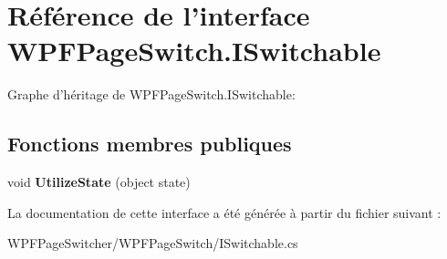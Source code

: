 \hypertarget{interface_w_p_f_page_switch_1_1_i_switchable}{\section{Référence de l'interface W\+P\+F\+Page\+Switch.\+I\+Switchable}
\label{interface_w_p_f_page_switch_1_1_i_switchable}
}


Graphe d'héritage de W\+P\+F\+Page\+Switch.\+I\+Switchable\+:
\subsection*{Fonctions membres publiques}
\begin{DoxyCompactItemize}
\item 
\hypertarget{interface_w_p_f_page_switch_1_1_i_switchable_ad1954f3df78181fa17c005960c89aede}{void {\bfseries Utilize\+State} (object state)}\label{interface_w_p_f_page_switch_1_1_i_switchable_ad1954f3df78181fa17c005960c89aede}

\end{DoxyCompactItemize}


La documentation de cette interface a été générée à partir du fichier suivant \+:\begin{DoxyCompactItemize}
\item 
W\+P\+F\+Page\+Switcher/\+W\+P\+F\+Page\+Switch/I\+Switchable.\+cs\end{DoxyCompactItemize}
